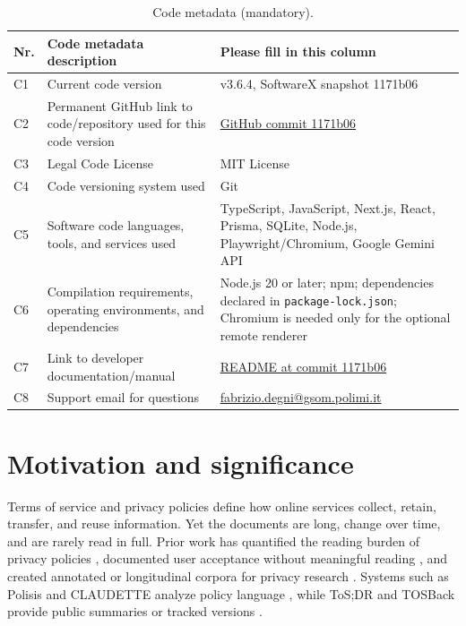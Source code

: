 \documentclass[preprint,12pt,a4paper]{elsarticle}
\begin{document}
\begin{table}[!h]
\centering
\footnotesize
\setlength{\tabcolsep}{4pt}
\begin{tabularx}{\textwidth}{|p{}|p{}|Y|}
\hline
\textbf{Nr.} & \textbf{Code metadata description} & \textbf{Please fill in this column} \\
\hline
C1 & Current code version & v3.6.4, SoftwareX snapshot 1171b06 \\
\hline
C2 & Permanent GitHub link to code/repository used for this code version & \href{https://github.com/sev7enITA/policywatcher/tree/1171b06a119954343c9a9124df4bdfdc9aab4a6d}{GitHub commit 1171b06} \\
\hline
C3 & Legal Code License & MIT License \\
\hline
C4 & Code versioning system used & Git \\
\hline
C5 & Software code languages, tools, and services used & TypeScript, JavaScript, Next.js, React, Prisma, SQLite, Node.js, Playwright/Chromium, Google Gemini API \\
\hline
C6 & Compilation requirements, operating environments, and dependencies & Node.js 20 or later; npm; dependencies declared in \texttt{package-lock.json}; Chromium is needed only for the optional remote renderer \\
\hline
C7 & Link to developer documentation/manual & \href{https://github.com/sev7enITA/policywatcher/blob/1171b06a119954343c9a9124df4bdfdc9aab4a6d/README.md}{README at commit 1171b06} \\
\hline
C8 & Support email for questions & \href{mailto:fabrizio.degni@gsom.polimi.it}{fabrizio.degni@gsom.polimi.it} \\
\hline
\end{tabularx}
\caption{Code metadata (mandatory).}
\label{tab:metadata}
\end{table}

\section{Motivation and significance}
\label{sec:motivation}

Terms of service and privacy policies define how online services collect,
retain, transfer, and reuse information. Yet the documents are long, change over
time, and are rarely read in full. Prior work has quantified the reading burden
of privacy policies \cite{mcdonald2008}, documented user acceptance without
meaningful reading \cite{obar2020}, and created annotated or longitudinal
corpora for privacy research \cite{wilson2016,amos2021}. Systems such as Polisis
and CLAUDETTE analyze policy language \cite{harkous2018,lippi2019}, while
ToS;DR and TOSBack provide public summaries or tracked versions
\cite{tosdr,tosback}.
\end{document}
